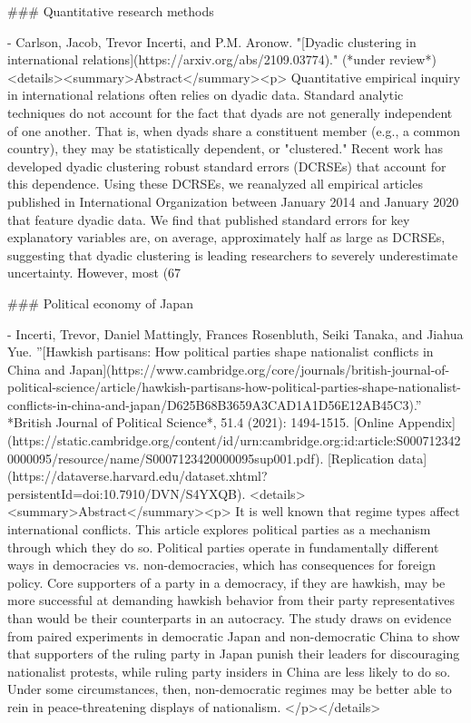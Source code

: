 ### Quantitative research methods
  
- Carlson, Jacob, Trevor Incerti, and P.M. Aronow. "[Dyadic clustering in international relations](https://arxiv.org/abs/2109.03774)." (*under review*)
   <details><summary>Abstract</summary><p>  Quantitative empirical inquiry in international relations often relies on dyadic data. Standard analytic techniques do not account for the fact that dyads are not generally independent of one another. That is, when dyads share a constituent member (e.g., a common country), they may be statistically dependent, or "clustered." Recent work has developed dyadic clustering robust standard errors (DCRSEs) that account for this dependence. Using these DCRSEs, we reanalyzed all empirical articles published in International Organization between January 2014 and January 2020 that feature dyadic data. We find that published standard errors for key explanatory variables are, on average, approximately half as large as DCRSEs, suggesting that dyadic clustering is leading researchers to severely underestimate uncertainty. However, most (67%
   
### Political economy of Japan

- Incerti, Trevor, Daniel Mattingly, Frances Rosenbluth, Seiki Tanaka, and Jiahua Yue. ''[Hawkish partisans: How political parties shape nationalist conflicts in China and Japan](https://www.cambridge.org/core/journals/british-journal-of-political-science/article/hawkish-partisans-how-political-parties-shape-nationalist-conflicts-in-china-and-japan/D625B68B3659A3CAD1A1D56E12AB45C3).'' *British Journal of Political Science*, 51.4 (2021): 1494-1515. [Online Appendix](https://static.cambridge.org/content/id/urn:cambridge.org:id:article:S0007123420000095/resource/name/S0007123420000095sup001.pdf). [Replication data](https://dataverse.harvard.edu/dataset.xhtml?persistentId=doi:10.7910/DVN/S4YXQB).  
  <details><summary>Abstract</summary><p> It is well known that regime types affect international conflicts. This article explores political parties as a mechanism through which they do so. Political parties operate in fundamentally different ways in democracies vs. non-democracies, which has consequences for foreign policy. Core supporters of a party in a democracy, if they are hawkish, may be more successful at demanding hawkish behavior from their party representatives than would be their counterparts in an autocracy. The study draws on evidence from paired experiments in democratic Japan and non-democratic China to show that supporters of the ruling party in Japan punish their leaders for discouraging nationalist protests, while ruling party insiders in China are less likely to do so. Under some circumstances, then, non-democratic regimes may be better able to rein in peace-threatening displays of nationalism. </p></details>

